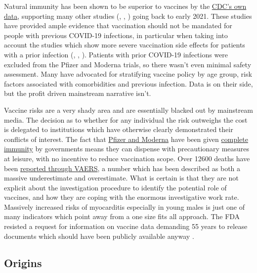 \documentclass[11pt,a4paper,notitlepage]{report}
\begin{document}
Natural immunity has been shown to be superior to vaccines by the \href{https://www.cdc.gov/mmwr/volumes/71/wr/mm7104e1.htm#F1_down}{CDC's own data}, supporting many other studies (\cite{Gazit2021.08.24.21262415}, \cite{doi:10.1126/science.abf4063}, \cite{Goldberg2021.04.20.21255670}) going back to early 2021. These studies have provided ample evidence that vaccination should not be mandated for people with previous COVID-19 infections, in particular when taking into account the studies which show more severe vaccination side effects for patients with a prior infection (\cite{Monforte2021}, \cite{LI20221082}, \cite{Raw22}). Patients with prior COVID-19 infections were excluded from the Pfizer and Moderna trials, so there wasn't even minimal safety assessment. Many have advocated for stratifying vaccine policy by age group, risk factors associated with comorbidities and previous infection. Data is on their side, but the profit driven mainstream narrative isn't.


Vaccine risks are a very shady area and are essentially blacked out by mainstream media. The decision as to whether for any individual the risk outweighs the cost is delegated to institutions which have otherwise clearly demonstrated their conflicts of interest. The fact that \href{https://www.cnbc.com/2020/12/16/covid-vaccine-side-effects-compensation-lawsuit.html}{Pfizer and Moderna} have been given \href{https://crsreports.congress.gov/product/pdf/LSB/LSB10443}{complete immunity} by governments means they can dispense with precautionary measures at leisure, with no incentive to reduce vaccination scope. Over 12600 deaths have been \href{https://www.cdc.gov/coronavirus/2019-ncov/vaccines/safety/adverse-events.html}{reported through VAERS}, a number which has been described as both a massive underestimate and overestimate. What is certain is that they are not explicit about the investigation procedure to identify the potential role of vaccines, and how they are coping with the enormous investigative work rate. Massively increased risks of myocarditis especially in young males \cite{10.1001/jama.2021.24110} is just one of many indicators which point away from a one size fits all approach. The FDA resisted a request for information on vaccine data demanding 55 years to release documents which should have been publicly available anyway \cite{mailonline19112021}.



\subsection*{Origins}
\end{document}
